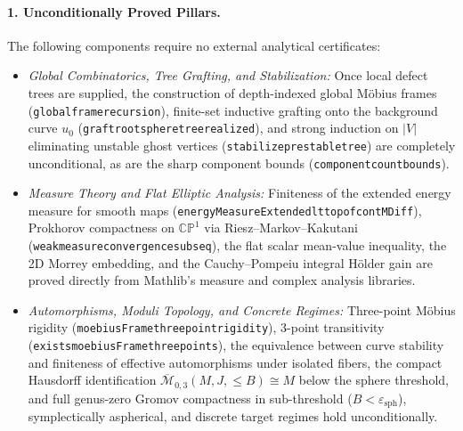 \documentclass[10pt]{article}
\renewcommand{\_}{\origus\allowbreak}
\newcommand{\CP}{\mathbb{CP}^1}
\newcommand{\eps}{\varepsilon}
\newcommand{\code}[1]{\texttt{#1}}
\begin{document}
\paragraph{1. Unconditionally Proved Pillars.}
The following components require no external analytical certificates:
\begin{itemize}
\item \emph{Global Combinatorics, Tree Grafting, and Stabilization:} Once local defect trees are
  supplied, the construction of depth-indexed global M\"obius frames (\code{global\_frame\_recursion}),
  finite-set inductive grafting onto the background curve $u_0$ (\code{graft\_root\_sphere\_tree\_realized}),
  and strong induction on $|V|$ eliminating unstable ghost vertices (\code{stabilize\_prestable\_tree})
  are completely unconditional, as are the sharp component bounds (\code{component\_count\_bounds}).
\item \emph{Measure Theory and Flat Elliptic Analysis:} Finiteness of the extended energy measure for
  smooth maps (\code{energyMeasureExtended\_lt\_top\_of\_contMDiff}), Prokhorov compactness on $\CP$
  via Riesz--Markov--Kakutani (\code{weak\_measure\_convergence\_subseq}), the flat scalar mean-value
  inequality, the 2D Morrey embedding, and the Cauchy--Pompeiu integral H\"older gain are proved
  directly from Mathlib's measure and complex analysis libraries.
\item \emph{Automorphisms, Moduli Topology, and Concrete Regimes:} Three-point M\"obius rigidity
  (\code{moebiusFrame\_three\_point\_rigidity}), 3-point transitivity
  (\code{exists\_moebiusFrame\_three\_points}), the equivalence between curve stability and
  finiteness of effective automorphisms under isolated fibers, the compact Hausdorff identification
  $\overline{\mathcal M}_{0,3}(M,J,\le B)\cong M$ below the sphere threshold, and full genus-zero
  Gromov compactness in sub-threshold ($B < \eps_{\mathrm{sph}}$), symplectically aspherical, and
  discrete target regimes hold unconditionally.
\end{itemize}
\end{document}
